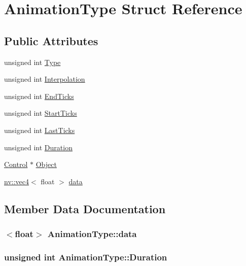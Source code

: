 \hypertarget{struct_animation_type}{
\section{AnimationType Struct Reference}
\label{struct_animation_type}
}
\subsection*{Public Attributes}
\begin{CompactItemize}
\item 
unsigned int \hyperlink{struct_animation_type_7949813aa1e5cb2319509acfdaf413e4}{Type}
\item 
unsigned int \hyperlink{struct_animation_type_53d47fec7a73ede3c289d28aae5846b5}{Interpolation}
\item 
unsigned int \hyperlink{struct_animation_type_d55cc117ddd1468b4aedad396ebd06a2}{EndTicks}
\item 
unsigned int \hyperlink{struct_animation_type_2cc19eb71ca6073276000d4ca03a37d5}{StartTicks}
\item 
unsigned int \hyperlink{struct_animation_type_9c1a9402bef261f7209d269d50660eb0}{LastTicks}
\item 
unsigned int \hyperlink{struct_animation_type_a1f29d03b66ea57523e653cb97a3347d}{Duration}
\item 
\hyperlink{class_control}{Control} $\ast$ \hyperlink{struct_animation_type_55d0abe86b25edd7e66956bbe5fe7e76}{Object}
\item 
\hyperlink{classnv_1_1vec4}{nv::vec4}$<$ float $>$ \hyperlink{struct_animation_type_0636df1775651d35326ea8d713ed9a70}{data}
\end{CompactItemize}


\subsection{Member Data Documentation}
\hypertarget{struct_animation_type_0636df1775651d35326ea8d713ed9a70}{
\subsubsection[{data}]{$<$float$>$ {\bf AnimationType::data}}}
\label{struct_animation_type_0636df1775651d35326ea8d713ed9a70}


\hypertarget{struct_animation_type_a1f29d03b66ea57523e653cb97a3347d}{
\subsubsection[{Duration}]{\setlength{\rightskip}{0pt plus 5cm}unsigned int {\bf AnimationType::Duration}}}
\label{struct_animation_type_a1f29d03b66ea57523e653cb97a3347d}


